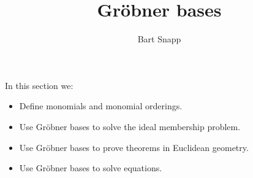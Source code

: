 \documentclass{ximera}
\author{Bart Snapp}
\title{Gr\"obner bases}
\begin{document}
\begin{abstract}
\end{abstract}
\maketitle
In this section we:

\begin{itemize}
\item Define monomials and monomial orderings.
\item Use Gr\"obner bases to solve the ideal membership problem.
\item Use Gr\"obner bases to prove theorems in Euclidean geometry.
\item Use Gr\"obner bases to solve equations.
\end{itemize}
\end{document}
